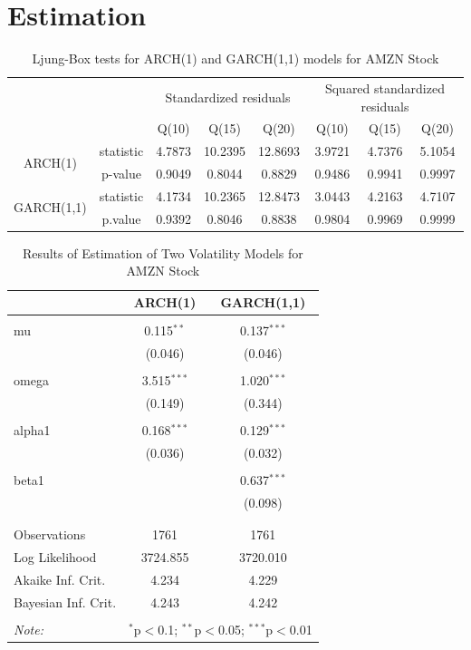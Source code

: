 \documentclass[paper=a4, fontsize=13pt]{article}
\begin{document}
\section{Estimation}

\begin{table}[!htbp] \centering 
  \caption{Ljung-Box tests for ARCH(1) and GARCH(1,1) models for AMZN Stock} 
  \label{} 
\begin{tabular}{cc|cccccc} 
\\[-1.8ex]\hline 
\hline
& & \multicolumn{3}{c}{Standardized residuals} & \multicolumn{3}{c}{Squared standardized residuals} \\
& & Q(10) & Q(15) & Q(20) & Q(10) & Q(15) & Q(20) \\
\hline 
\multirow{2}{*}{ARCH(1)} & statistic & 4.7873 & 10.2395 & 12.8693 & 3.9721 & 4.7376 & 5.1054 \\
& p-value & 0.9049 & 0.8044 & 0.8829 & 0.9486 & 0.9941 & 0.9997 \\
\multirow{2}{*}{GARCH(1,1)} & statistic & 4.1734 & 10.2365 & 12.8473 & 3.0443 & 4.2163 & 4.7107 \\
& p.value & 0.9392 & 0.8046 & 0.8838 & 0.9804 & 0.9969 & 0.9999 \\
\hline
\hline 
\end{tabular} 
\end{table} 

\begin{table}[!htbp] \centering 
  \caption{Results of Estimation of Two Volatility Models for AMZN Stock} 
  \label{} 
\begin{tabular}{@{\extracolsep{5pt}}lcc} 
\\[-1.8ex]\hline 
\hline
 & ARCH(1) & GARCH(1,1) \\ 
\hline \\[-1.8ex] 
 mu & 0.115$^{**}$ & 0.137$^{***}$ \\ 
  & (0.046) & (0.046) \\ 
  & & \\ 
 omega & 3.515$^{***}$ & 1.020$^{***}$ \\ 
  & (0.149) & (0.344) \\ 
  & & \\ 
 alpha1 & 0.168$^{***}$ & 0.129$^{***}$ \\ 
  & (0.036) & (0.032) \\ 
  & & \\ 
 beta1 &  & 0.637$^{***}$ \\ 
  &  & (0.098) \\ 
  & & \\ 
\hline \\[-1.8ex] 
Observations & 1761 & 1761 \\ 
Log Likelihood & 3724.855 & 3720.010 \\ 
Akaike Inf. Crit. & 4.234 & 4.229 \\ 
Bayesian Inf. Crit. & 4.243 & 4.242 \\ 
\hline 
\hline \\[-1.8ex] 
\textit{Note:}  & \multicolumn{2}{r}{$^{*}$p$<$0.1; $^{**}$p$<$0.05; $^{***}$p$<$0.01} \\ 
\end{tabular} 
\end{table} 
\end{document}
